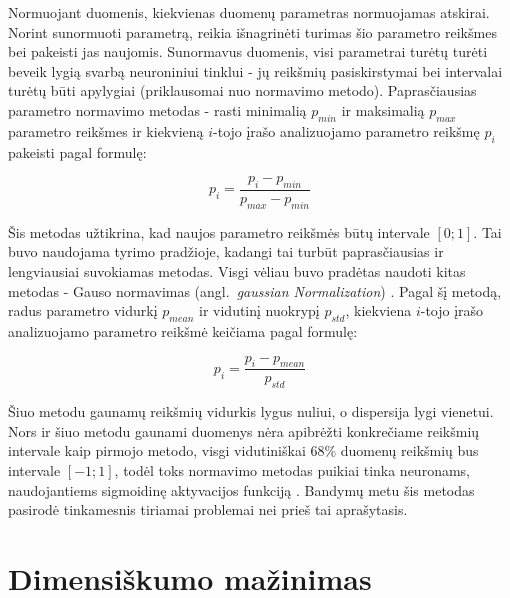 \documentclass{VUMIFPSbakalaurinis}
\begin{document}
Normuojant duomenis, kiekvienas duomenų parametras normuojamas atskirai.
Norint sunormuoti parametrą, reikia išnagrinėti turimas šio parametro reikšmes bei pakeisti jas naujomis.
Sunormavus duomenis, visi parametrai turėtų turėti beveik lygią svarbą neuroniniui tinklui - jų reikšmių pasiskirstymai bei intervalai turėtų būti apylygiai (priklausomai nuo normavimo metodo).
Paprasčiausias parametro normavimo metodas - rasti minimalią $p_{min}$ ir maksimalią $p_{max}$ parametro reikšmes ir kiekvieną $i$-tojo įrašo analizuojamo parametro reikšmę $p_i$ pakeisti pagal formulę:

\begin{equation}
p_i = \frac{p_i - p_{min}}{p_{max} - p_{min}}
\end{equation}

Šis metodas užtikrina, kad naujos parametro reikšmės būtų intervale $[0; 1]$.
Tai buvo naudojama tyrimo pradžioje, kadangi tai turbūt paprasčiausias ir lengviausiai suvokiamas metodas.
Visgi vėliau buvo pradėtas naudoti kitas metodas - Gauso normavimas (angl.~\textit{gaussian Normalization}) \cite[817~psl.]{gaussian}.
Pagal šį metodą, radus parametro vidurkį $p_{mean}$ ir vidutinį nuokrypį $p_{std}$, kiekviena $i$-tojo įrašo analizuojamo parametro reikšmė keičiama pagal formulę:

\begin{equation}
p_i = \frac{p_i - p_{mean}}{p_{std}}
\end{equation}

Šiuo metodu gaunamų reikšmių vidurkis lygus nuliui, o dispersija lygi vienetui.
Nors ir šiuo metodu gaunami duomenys nėra apibrėžti konkrečiame reikšmių intervale kaip pirmojo metodo, visgi vidutiniškai 68\% duomenų reikšmių bus intervale $[-1; 1]$, todėl toks normavimo metodas puikiai tinka neuronams, naudojantiems sigmoidinę aktyvacijos funkciją \cite[817~psl.]{gaussian}.
Bandymų metu šis metodas pasirodė tinkamesnis tiriamai problemai nei prieš tai aprašytasis.



\section{Dimensiškumo mažinimas}
\end{document}
